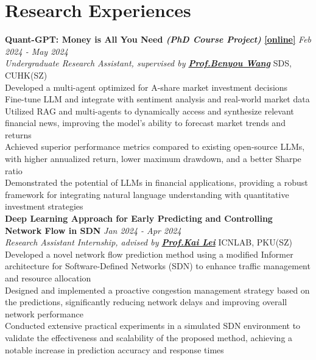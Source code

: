 \documentclass[a4paper,8pt]{article}
\begin{document}
\section*{Research Experiences}
\textbf{Quant-GPT: Money is All You Need \textnormal{\small \textit{(PhD Course Project)}} \href{https://github.com/TobyYang7/Quant-GPT}{[online]}} \hfill \textit{Feb 2024 - May 2024}\\
\textit{Undergraduate Research Assistant, supervised by \textbf{\href{https://wabyking.github.io/old.html}{Prof.\@ Benyou Wang}}} \hfill SDS, CUHK(SZ)\\
\textbullet Developed a multi-agent optimized for A-share market investment decisions\\ 
\textbullet Fine-tune LLM and integrate with sentiment analysis and real-world market data\\
\textbullet Utilized RAG and multi-agents to dynamically access and synthesize relevant financial news, improving the model's ability to forecast market trends and returns\\
\textbullet Achieved superior performance metrics compared to existing open-source LLMs, with higher annualized return, lower maximum drawdown, and a better Sharpe ratio\\
\textbullet Demonstrated the potential of LLMs in financial applications, providing a robust framework for integrating natural language understanding with quantitative investment strategies\\
\textbf{Deep Learning Approach for Early Predicting and Controlling Network Flow in SDN} \hfill \textit{Jan 2024 - Apr 2024}\\
\textit{Research Assistant Internship, advised by \textbf{\href{https://scholar.google.com/citations?user=xOs3daIAAAAJ&hl=en}{Prof.\@ Kai Lei}}} \hfill ICNLAB, PKU(SZ)\\
\textbullet Developed a novel network flow prediction method using a modified Informer architecture for Software-Defined Networks (SDN) to enhance traffic management and resource allocation\\
\textbullet Designed and implemented a proactive congestion management strategy based on the predictions, significantly reducing network delays and improving overall network performance\\
\textbullet Conducted extensive practical experiments in a simulated SDN environment to validate the effectiveness and scalability of the proposed method, achieving a notable increase in prediction accuracy and response times
\end{document}
